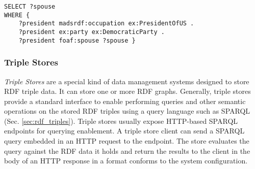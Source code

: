 \begin{lstlisting}[label={lst:sparqlexample},caption={A SPARQL query that returns the spouse of each US president whose party is the democratic.}]
SELECT ?spouse
WHERE { 
	?president madsrdf:occupation ex:PresidentOfUS .
	?president ex:party ex:DemocraticParty .
	?president foaf:spouse ?spouse }
\end{lstlisting}
 
 \subsubsection{Triple Stores}
 \textit{Triple Stores} are a special kind of data management systems designed to store RDF triple data. 
 It can store one or more RDF graphs. 
 Generally, triple stores provide a standard interface to enable performing queries and other semantic operations on the stored RDF triples using a query language such as SPARQL (Sec. \ref{sec:rdf_triples}).
 Triple stores usually expose HTTP-based SPARQL endpoints for querying enablement. 
 A triple store client can send a SPARQL query embedded in an HTTP request to the endpoint.
 The store evaluates the query against the RDF data it holds and return the results to the client in the body of an HTTP response in a format conforms to the system configuration.
 
\clearpage